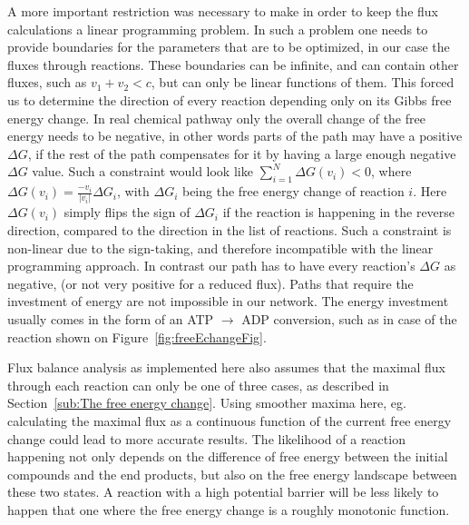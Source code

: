 \documentclass[a4paper,12pt]{article}
\begin{document}
A more important restriction was necessary to make in order to keep the flux calculations a linear programming problem. In such a problem one needs to provide boundaries for the parameters that are to be optimized, in our case the fluxes through reactions. These boundaries can be infinite, and can contain other fluxes, such as $v_1+v_2 < c$, but can only be linear functions of them. This forced us to determine the direction of every reaction depending only on its Gibbs free energy change. In real chemical pathway only the overall change of the free energy needs to be negative, in other words parts of the path may have a positive $\Delta G$, if the rest of the path compensates for it by having a large enough negative $\Delta G$ value. Such a constraint would look like $\sum_{i=1}^N \Delta G \left( v_i \right)<0$, where $\Delta G \left( v_i \right)=\frac{-v_i}{|v_i|} \Delta G_i$, with $\Delta G_i$ being the free energy change of reaction $i$. Here $\Delta G \left( v_i \right)$ simply flips the sign of $\Delta G_i$ if the reaction is happening in the reverse direction, compared to the direction in the list of reactions. Such a constraint is non-linear due to the sign-taking, and therefore incompatible with the linear programming approach. In contrast our path has to have every reaction's $\Delta G$ as negative, (or not very positive for a reduced flux).
Paths that require the investment of energy are not impossible in our network. The energy investment usually comes in the form of an ATP $\rightarrow$ ADP conversion, such as in case of the reaction shown on Figure~\ref{fig:freeEchangeFig}. 

Flux balance analysis as implemented here also assumes that the maximal flux through each reaction can only be one of three cases, as described in Section~\ref{sub:The free energy change}. Using smoother maxima here, eg. calculating the maximal flux as a continuous function of the current free energy change could lead to more accurate results. The likelihood of a reaction happening not only depends on the difference of free energy between the initial compounds and the end products, but also on the free energy landscape between these two states. A reaction with a high potential barrier will be less likely to happen that one where the free energy change is a roughly monotonic function. 


\end{document}
